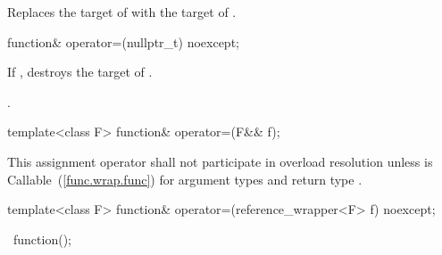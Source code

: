 \begin{itemdescr}
\pnum
\effects Replaces the target of 
with the target of .

\pnum
\returns {}
\end{itemdescr}

%
%
\begin{itemdecl}
function& operator=(nullptr_t) noexcept;
\end{itemdecl}

\begin{itemdescr}
\pnum\effects If , destroys the target of .

\pnum\postconditions {}.

\pnum\returns {}
\end{itemdescr}

%
%
\begin{itemdecl}
template<class F> function& operator=(F&& f);
\end{itemdecl}

\begin{itemdescr}
\pnum\effects {}

\pnum\returns {}

\pnum\remarks This assignment operator shall not participate in overload
resolution unless  is
Callable~(\ref{func.wrap.func}) for argument types  and
return type .
\end{itemdescr}

%
%
\begin{itemdecl}
template<class F> function& operator=(reference_wrapper<F> f) noexcept;
\end{itemdecl}

\begin{itemdescr}
\pnum\effects {}

\pnum
\returns {}
\end{itemdescr}

%
\begin{itemdecl}
~function();
\end{itemdecl}

